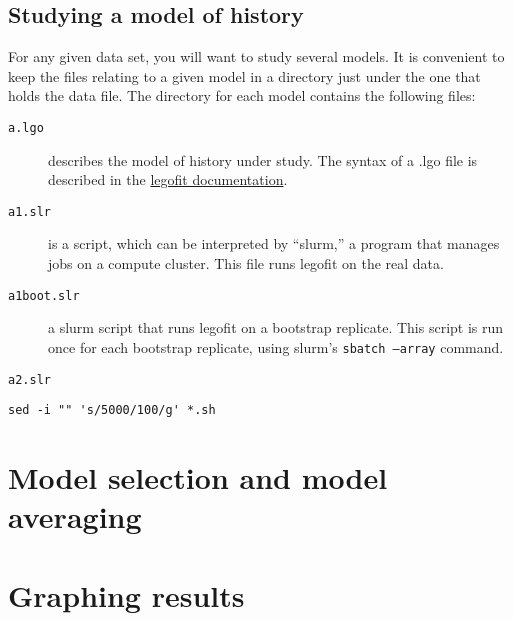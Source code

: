 \documentclass[11pt]{article}
\begin{document}
\subsection{Studying a model of history}
For any given data set, you will want to study several models. It is
convenient to keep the files relating to a given model in a directory
just under the one that holds the data file. The directory for each
model contains the following files:
\begin{description}
  \item[\texttt{a.lgo}] describes the model of history
under study. The syntax of a .lgo file is described in the
\href{http://alanrogers.github.io/legofit/html/index.html#lgo}{legofit
  documentation}.
  \item[\texttt{a1.slr}] is a script, which can be interpreted by
    ``slurm,'' a program that manages jobs on a compute cluster. This
    file runs legofit on the real data.
  \item[\texttt{a1boot.slr}] a slurm script that runs legofit on a
    bootstrap replicate. This script is run once for each bootstrap
    replicate, using slurm's \texttt{sbatch --array} command.
  \item[\texttt{a2.slr}]
\end{description}    

\begin{verbatim}
sed -i "" 's/5000/100/g' *.sh 
\end{verbatim}

\section{Model selection and model averaging}
\label{sec.msma}

\section{Graphing results}
\label{sec.graph}

\printbibliography
\end{document}
